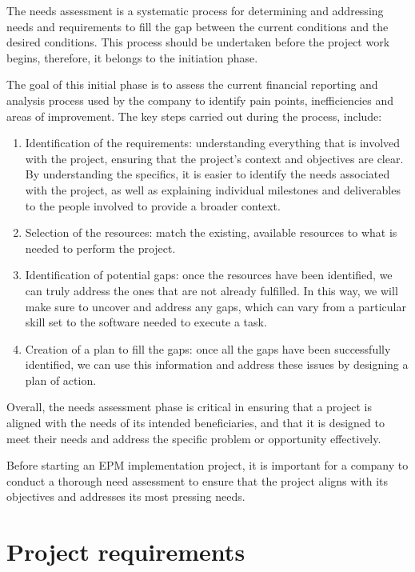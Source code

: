 \documentclass[12pt,a4paper,openright,twoside]{book}
\begin{document}
The needs assessment is a systematic process for determining and addressing needs and requirements to fill the gap between the current conditions and the desired conditions.
%
This process should be undertaken before the project work begins, therefore, it belongs to the initiation phase.

The goal of this initial phase is to assess the current financial reporting and analysis process used by the company to identify pain points, inefficiencies and areas of improvement.
%
The key steps carried out during the process, include:

\begin{enumerate}
    \item Identification of the requirements: understanding everything that is involved with the project, ensuring that the project’s context and objectives are clear. By understanding the specifics, it is easier to identify the needs associated with the project, as well as explaining individual milestones and deliverables to the people involved to provide a broader context.
    \item Selection of the resources: match the existing, available resources to what is needed to perform the project. 
    \item Identification of potential gaps: once the resources have been identified, we can truly address the ones that are not already fulfilled. In this way, we will make sure to uncover and address any gaps, which can vary from a particular skill set to the software needed to execute a task. 
    \item Creation of a plan to fill the gaps: once all the gaps have been successfully identified, we can use this information and address these issues by designing a plan of action. 
\end{enumerate}

Overall, the needs assessment phase is critical in ensuring that a project is aligned with the needs of its intended beneficiaries, and that it is designed to meet their needs and address the specific problem or opportunity effectively.

Before starting an EPM implementation project, it is important for a company to conduct a thorough need assessment to ensure that the project aligns with its objectives and addresses its most pressing needs.

\section{Project requirements}
\end{document}

